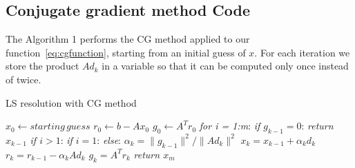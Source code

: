 \documentclass{article}
\begin{document}
\subsection{Conjugate gradient method Code}\label{subsec:conjugate-gradient-method-code}
The Algorithm 1 performs the CG method applied to our function~\ref{eq:cgfunction}, starting from an initial guess of $x$.
For each iteration we store the product $Ad_k$ in a variable so that it can be computed only once instead of twice.
\makeatletter
\makeatother
\begin{algorithm}
\caption{LS resolution with CG method}
\begin{algorithmic}[1]
\State $x_0 \gets starting\,guess$
\State $r_0 \gets b -  Ax_0$
\State $g_0 \gets A^{T}r_0$ 
\State \emph{for i = 1:m}:
\State \quad\emph{if $g_{k-1} = 0$}:
\State\quad\quad\textit{return $x_{k-1}$}
\State \quad\emph{if $i > 1$}:
\State\quad{}
\State \quad\emph{if $i = 1$}: 
\State\quad{}
\State \quad\emph{else}: 
\State\quad{}
\State\quad $\alpha_{k} = \|g_{k-1}\|^2 / \|Ad_{k}\|^2$
\State\quad $x_{k} = x_{k-1} + \alpha_{k}d_{k}$
\State\quad $r_{k} = r_{k-1} - \alpha_{k}Ad_{k}$
\State\quad $g_{k} = A^{T}r_{k}$
\State\textit{return $x_{m}$}
\EndFunction
\end{algorithmic}
\end{algorithm}
\end{document}
